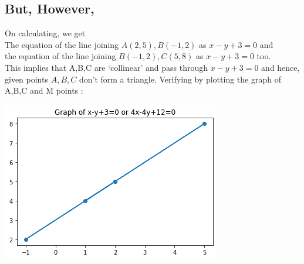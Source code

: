 \documentclass[12pt]{article}
\begin{document}
 \subsection*{But, However,} On calculating, we get\\
     The equation of the line joining $A(2,5), B(-1,2)$ as $x-y+3=0$ and \\
     the equation of the line joining $B(-1,2), C(5,8)$ as $x-y+3=0$ too.\\
     This implies that A,B,C are `collinear' and pass through $x-y+3=0$ and hence, given points $A,B,C$ don't form a triangle.\newline
    Verifying by plotting the graph of A,B,C and M points :
  \begin{center}
       \includegraphics[width=\textwidth]{prv1b.png}
  \end{center}
    
\end{document}
